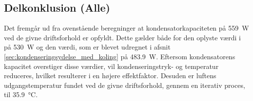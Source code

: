 \documentclass[../Hovedrapport.tex]{subfiles}
\begin{document}
\subsection{Delkonklusion (Alle)}
Det fremgår ud fra ovenstående beregninger at kondensatorkapaciteten på \SI{559}{\watt} ved de givne driftsforhold er opfyldt. Dette gælder både for den oplyste værdi i \citep{Coolselector} på \SI{530}{\watt} og den værdi, som er blevet udregnet i afsnit \ref{sec:kondenseringsydelse_med_koling} på \SI{483,9}{\watt}. Eftersom kondensatorens kapacitet overstiger disse værdier, vil kondenseringstryk- og temperatur reduceres, hvilket resulterer i en højere effektfaktor.  
Desuden er luftens udgangstemperatur fundet ved de givne driftsforhold, gennem en iterativ proces, til \SI{35,9}{\celsius}.  
\end{document}
